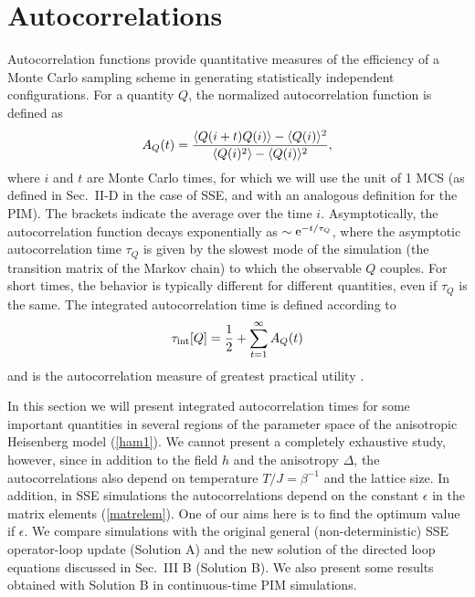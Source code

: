 \documentclass[10pt,pre,aps,twocolumn,showpacs,superscriptaddress,
floatfix]{revtex4}
\begin{document}
\section{Autocorrelations}

Autocorrelation functions provide quantitative measures of the efficiency of
a Monte Carlo sampling scheme in generating statistically independent
configurations. For a quantity $Q$, the normalized autocorrelation function is
defined as
\begin{equation}
A_Q(t) = {\langle Q(i+t)Q(i) \rangle - \langle Q(i) \rangle ^2 \over 
\langle Q(i)^2 \rangle - \langle Q(i) \rangle^2 },
\label{atau}
\end{equation}
where $i$ and $t$ are Monte Carlo times, for which we will use the unit of
1 MCS (as defined in Sec.~II-D in the case of SSE, and with an analogous
definition for the PIM). The brackets indicate the average over the 
time $i$. Asymptotically, the autocorrelation function decays exponentially 
as $\sim {\rm e}^{-t/\tau_Q}$, where the asymptotic 
autocorrelation time $\tau_Q$ is given by the slowest mode of the simulation
(the transition matrix of the Markov chain) to which the observable $Q$ 
couples. For short times, the behavior is typically different for 
different quantities, even if $\tau_Q$ is the same. The integrated 
autocorrelation time is defined according to 
\begin{equation}
\tau_{\rm int}[Q] = {1\over 2} + \sum_{t=1}^\infty A_Q(t)
\end{equation}
and is the autocorrelation measure
of greatest practical utility \cite{evertzchapter}. 

In this section we will present integrated autocorrelation times for some 
important quantities in several regions of the parameter space of the 
anisotropic Heisenberg model (\ref{ham1}). We cannot present a completely 
exhaustive study, however, since in addition to the field $h$ and the
anisotropy $\Delta$, the autocorrelations also depend on temperature 
$T/J = \beta^{-1}$ and the lattice size. In addition, in SSE simulations the 
autocorrelations depend on the constant 
$\epsilon$ in the matrix elements (\ref{matrelem}).
One of our aims here is to find the optimum value if $\epsilon$. We compare 
simulations with the original general (non-deterministic) SSE operator-loop 
update \cite{sse3} (Solution A) and the new solution of the directed loop 
equations discussed in Sec.~III B (Solution B). We also present some results 
obtained with Solution B in continuous-time PIM simulations.
\end{document}
